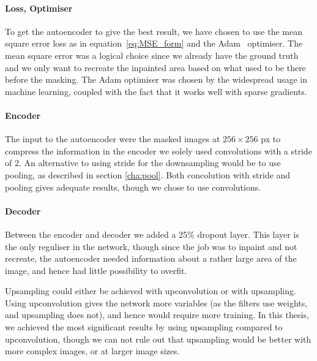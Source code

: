 \paragraph{Loss, Optimiser}
To get the autoencoder to give the best result, we have chosen to use the mean square error loss as in equation~\ref{eq:MSE_form} and the Adam~\cite{adam} optimiser.
The mean square error was a logical choice since we already have the ground truth and we only want to recreate the inpainted area based on what used to be there before the masking.
The Adam optimiser was chosen by the widespread usage in machine learning, coupled with the fact that it works well with sparse gradients.

\paragraph{Encoder}
The input to the autoencoder were the masked images at $256 \times 256$ px to compress the information in the encoder we solely used convolutions with a stride of 2. An alternative to using stride for the downsampling would be to use pooling, as described in section \ref{cha:pool}. Both concolution with stride and pooling gives adequate results, though we chose to use convolutions.



\paragraph{Decoder}
Between the encoder and decoder we added a 25\% dropout layer. This layer is the only reguliser in the network, though since the job was to inpaint and not recreate, the autoencoder needed information about a rather large area of the image, and hence had little possibility to overfit.

Upsampling could either be achieved with upconvolution or with upsampling.
Using upconvolution gives the network more variables (as the filters use weights, and upsampling does not), and hence would require more training. 
In this thesis, we achieved the most significant results by using upsampling compared to upconvolution, though we can not rule out that upsampling would be better with more complex images, or at larger image sizes.

\vspace{5px}

